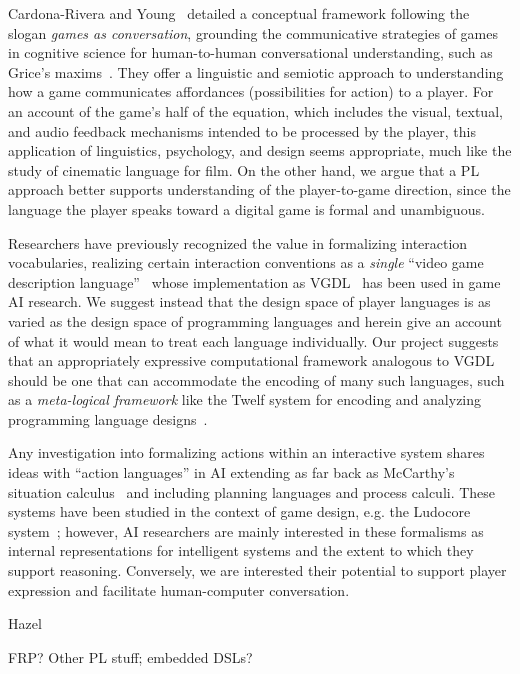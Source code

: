 
Cardona-Rivera and Young~\cite{cardona2014games}
detailed a conceptual framework following the slogan {\em games as
conversation}, grounding the communicative strategies of games in cognitive
science for human-to-human conversational understanding, such as Grice's
maxims~\cite{grice1975logic}. They offer a linguistic and semiotic approach to
understanding how a game communicates affordances (possibilities for
action) to a player.  For an account of the game's half of the equation,
which includes the visual, textual, and audio feedback mechanisms intended
to be processed by the player, this application of linguistics, psychology,
and design seems appropriate, much like the study of cinematic language for
film.  On the other hand, we argue that a PL approach better supports
understanding of the player-to-game direction, since the language the
player speaks toward a digital game is formal and unambiguous.

Researchers have previously recognized the value in formalizing interaction
vocabularies, realizing certain interaction conventions as a {\em single}
``video game description language''~\cite{ebner2013towards} whose
implementation as VGDL~\cite{schaul2013video} has been used in game AI research. We
suggest instead that the design space of player languages is as varied as
the design space of programming languages and herein give an account of
what it would mean to treat each language individually.
Our project suggests that an appropriately expressive computational
framework analogous to VGDL should be one that can accommodate the encoding
of many such languages, such as a {\em meta-logical framework} like the
Twelf system for encoding and analyzing programming language
designs~\cite{pfenning1999system}. 

Any investigation into formalizing actions within an interactive system
shares ideas with ``action languages'' in AI extending as far back as
McCarthy's situation calculus~\cite{mccarthy1969some} and including
planning languages and process calculi.  These systems have been studied in the
context of game design, e.g. the Ludocore system~\cite{smith2010ludocore};
however, AI researchers are mainly interested in these formalisms as internal
representations for intelligent systems and the extent to which they support
reasoning.  Conversely, we are interested their potential to support player
expression and facilitate human-computer conversation.


Hazel

FRP? Other PL stuff; embedded DSLs?
